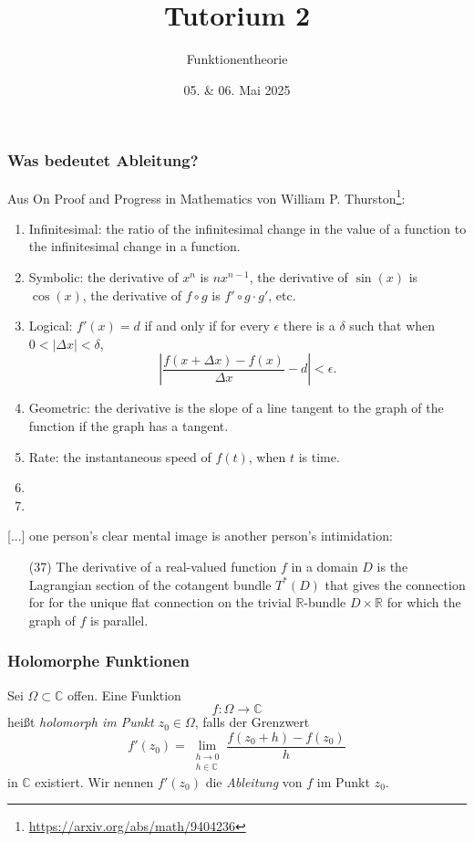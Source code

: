 \documentclass[10pt]{beamer}
\author[\url{https://fdf-uni.github.io/ft}]{}
\title{Tutorium 2}
\subtitle{\texorpdfstring{Funktionentheorie\vspace*{-1.5cm}}{Funktionentheorie}}
\date{05. \& 06. Mai 2025}
\begin{document}
\begin{frame}
	\titlepage
\end{frame}
\begin{frame}
	\frametitle{Was bedeutet \glqq Ableitung\grqq{}?}
	\pause
	Aus \glqq{}On Proof and Progress in Mathematics\grqq{} von William P. Thurston\footnote{\url{https://arxiv.org/abs/math/9404236}}:
	\pause
	\begin{enumerate}[label=(\arabic*)]
		\item Infinitesimal: the ratio of the infinitesimal change in the value of a function to the infinitesimal change in a function.
		      \pause
		\item Symbolic: the derivative of $x^n$ is $n x^{n - 1}$, the derivative of $\sin(x)$ is $\cos(x)$, the derivative of $f \circ g$ is $f' \circ g \cdot g'$, etc.
		      \pause
		\item Logical: $f'(x) = d$ if and only if for every $\epsilon$ there is a $\delta$ such that when $0 < \lvert \Delta x \rvert < \delta$,
		      \[ \left\lvert \frac{f(x + \Delta x) - f(x)}{\Delta x} - d \right\rvert < \epsilon. \]
		      \pause
		\item Geometric: the derivative is the slope of a line tangent to the graph of the function if the graph has a tangent.
		      \pause
		\item Rate: the instantaneous speed of $f(t)$, when $t$ is time.
		      \pause
		\item {\color<10->{blue}{Approximation: The derivative of a function is the best linear approximation to the function near a point.}}
		      \pause
		\item {\color<11->{blue}{Microscopic: The derivative of a function is the limit of what you get by looking at it under a microscope of higher and higher power.}}
	\end{enumerate}
\end{frame}
\begin{frame}
	\glqq{}[...] one person's clear mental image is another person's intimidation:
	\begin{enumerate}
		\item[(37)] The derivative of a real-valued function $f$ in a domain $D$ is the Lagrangian section of the cotangent bundle $T^{\ast}(D)$ that gives the connection for for the unique flat connection on the trivial $\mathbb{R}$-bundle $D \times \mathbb{R}$ for which the graph of $f$ is parallel.\grqq{}
	\end{enumerate}
\end{frame}
\begin{frame}
	\frametitle{Holomorphe Funktionen}
	\begin{definition}
		Sei $\Omega \subset \mathbb{C}$ offen.
		Eine Funktion
		$$
			f \colon \Omega \to \mathbb{C}
		$$
		heißt \emph{holomorph im Punkt $z_0 \in \Omega$}, falls der Grenzwert
		$$
			f'(z_0) = \lim_{\substack{h \to 0 \\ h \in \mathbb{C}}} \frac{f(z_0 + h) - f(z_0)}{h}
		$$
		in $\mathbb{C}$ existiert.
		Wir nennen $f'(z_0)$ die \emph{Ableitung} von $f$ im Punkt $z_0$.
	\end{definition}
\end{frame}
\end{document}
